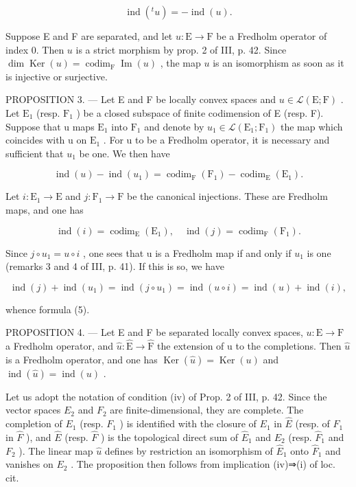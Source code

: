 \[
\operatorname{ind} (^ {t} u) = - \operatorname{ind} (u).\tag{4}
\]

Suppose E and F are separated, and let \(u\colon\mathrm{E}\to\mathrm{F}\) be a Fredholm operator of index 0. Then \(u\) is a strict morphism by prop. 2 of III, p. 42. Since \(\dim\operatorname{Ker}(u)=\operatorname{codim}_{\mathrm{F}}\operatorname{Im}(u)\) , the map \(u\) is an isomorphism as soon as it is injective or surjective.

PROPOSITION 3. --- Let E and F be locally convex spaces and \(u \in \mathcal{L}(\mathrm{E};\mathrm{F})\) . Let \(\mathrm{E}_{1}\) (resp. \(\mathrm{F}_{1}\) ) be a closed subspace of finite codimension of E (resp. F). Suppose that u maps \(\mathrm{E}_{1}\) into \(\mathrm{F}_{1}\) and denote by \(u_{1} \in \mathcal{L}(\mathrm{E}_{1};\mathrm{F}_{1})\) the map which coincides with u on \(\mathrm{E}_{1}\) . For u to be a Fredholm operator, it is necessary and sufficient that \(u_{1}\) be one. We then have

\[
\operatorname{ind} (u) - \operatorname{ind} \left(u _ {1}\right) = \operatorname{codim} _ {\mathrm{F}} \left(\mathrm{F} _ {1}\right) - \operatorname{codim} _ {\mathrm{E}} \left(\mathrm{E} _ {1}\right).\tag{5}
\]

Let \(i\colon \mathrm{E}_{1}\to \mathrm{E}\) and \(j\colon \mathrm{F}_{1}\to \mathrm{F}\) be the canonical injections. These are Fredholm maps, and one has

\[
\operatorname{ind} (i) = \operatorname{codim} _ {\mathrm{E}} (\mathrm{E} _ {1}), \quad \operatorname{ind} (j) = \operatorname{codim} _ {\mathrm{F}} (\mathrm{F} _ {1}).
\]

Since \(j \circ u_{1} = u \circ i\) , one sees that u is a Fredholm map if and only if \(u_{1}\) is one (remarks 3 and 4 of III, p. 41). If this is so, we have

\[
\operatorname{ind} (j) + \operatorname{ind} (u _ {1}) = \operatorname{ind} (j \circ u _ {1}) = \operatorname{ind} (u \circ i) = \operatorname{ind} (u) + \operatorname{ind} (i),
\]

whence formula (5).

PROPOSITION 4. --- Let E and F be separated locally convex spaces, \(u: \mathrm{E} \to \mathrm{F}\) a Fredholm operator, and \(\widehat{u}: \widehat{\mathrm{E}} \to \widehat{\mathrm{F}}\) the extension of u to the completions. Then \(\widehat{u}\) is a Fredholm operator, and one has \(\operatorname{Ker}(\widehat{u}) = \operatorname{Ker}(u)\) and \(\operatorname{ind}(\widehat{u}) = \operatorname{ind}(u)\) .

Let us adopt the notation of condition (iv) of Prop. 2 of III, p. 42. Since the vector spaces \(E_{2}\) and \(F_{2}\) are finite-dimensional, they are complete. The completion of \(E_{1}\) (resp. \(F_{1}\) ) is identified with the closure of \(E_{1}\) in \(\widehat{E}\) (resp. of \(F_{1}\) in \(\widehat{F}\) ), and \(\widehat{E}\) (resp. \(\widehat{F}\) ) is the topological direct sum of \(\widehat{E}_{1}\) and \(E_{2}\) (resp. \(\widehat{F}_{1}\) and \(F_{2}\) ). The linear map \(\widehat{u}\) defines by restriction an isomorphism of \(\widehat{E}_{1}\) onto \(\widehat{F}_{1}\) and vanishes on \(E_{2}\) . The proposition then follows from implication (iv)⇒(i) of loc. cit.

